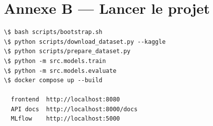 \documentclass[11pt,a4paper]{article}
\begin{document}
\appendix
\section{Annexe B --- Lancer le projet}

\begin{lstlisting}[caption={Installation complète et lancement (sortie terminal).}]
\$ bash scripts/bootstrap.sh
\$ python scripts/download_dataset.py --kaggle
\$ python scripts/prepare_dataset.py
\$ python -m src.models.train
\$ python -m src.models.evaluate
\$ docker compose up --build

  frontend  http://localhost:8080
  API docs  http://localhost:8000/docs
  MLflow    http://localhost:5000
\end{lstlisting}
\end{document}
